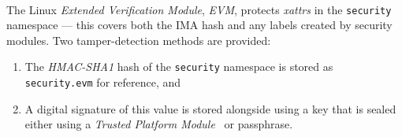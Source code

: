 \paragraph{} The Linux \textit{Extended Verification Module}, \textit{EVM}, protects \textit{xattrs} in the \texttt{security} namespace --- this covers both the IMA hash and any labels created by security modules. Two tamper-detection methods are provided:

\begin{enumerate}
    \item The \textit{HMAC-SHA1} hash of the \texttt{security} namespace is stored as \texttt{security.evm} for reference, and
    \item A digital signature of this value is stored alongside using a key that is sealed either using a \textit{Trusted Platform Module}~\cite{tpm} or passphrase.
\end{enumerate}
